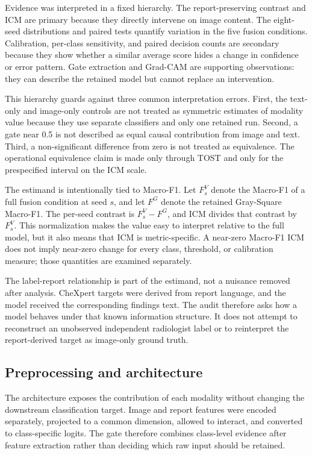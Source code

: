 \documentclass[10pt,a4paper,twocolumn]{article}
\begin{document}
Evidence was interpreted in a fixed hierarchy. The report-preserving contrast
and ICM are primary because they directly intervene on image content. The
eight-seed distributions and paired tests quantify variation in the five
fusion conditions. Calibration, per-class sensitivity, and paired decision
counts are secondary because they show whether a similar average score hides a
change in confidence or error pattern. Gate extraction and Grad-CAM are
supporting observations: they can describe the retained model but cannot
replace an intervention.

This hierarchy guards against three common interpretation errors. First, the
text-only and image-only controls are not treated as symmetric estimates of
modality value because they use separate classifiers and only one retained run.
Second, a gate near 0.5 is not described as equal causal contribution from
image and text. Third, a non-significant difference from zero is not treated as
equivalence. The operational equivalence claim is made only through TOST and
only for the prespecified interval on the ICM scale.

The estimand is intentionally tied to Macro-F1. Let $F_{s}^{V}$ denote the
Macro-F1 of a full fusion condition at seed $s$, and let $F^{G}$ denote the
retained Gray-Square Macro-F1. The per-seed contrast is $F_{s}^{V}-F^{G}$, and
ICM divides that contrast by $F_{s}^{V}$. This normalization makes the value
easy to interpret relative to the full model, but it also means that ICM is
metric-specific. A near-zero Macro-F1 ICM does not imply near-zero change for
every class, threshold, or calibration measure; those quantities are examined
separately.

The label-report relationship is part of the estimand, not a nuisance removed
after analysis. CheXpert targets were derived from report language, and the
model received the corresponding findings text. The audit therefore asks how a
model behaves under that known information structure. It does not attempt to
reconstruct an unobserved independent radiologist label or to reinterpret the
report-derived target as image-only ground truth.

\subsection{Preprocessing and architecture}\label{sec:architecture}

The architecture exposes the contribution of each modality without changing
the downstream classification target. Image and report features were encoded
separately, projected to a common dimension, allowed to interact, and converted
to class-specific logits. The gate therefore combines class-level evidence
after feature extraction rather than deciding which raw input should be
retained.
\end{document}
